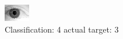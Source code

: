 \begin{figure}[h!]
\begin{center}
\includegraphics[width=0.60\columnwidth]{figures/ID2218_class_4_target_3.png}
\end{center}
\caption{ Classification: 4 actual target: 3}
\label{fig:ID2218_class_4_target_3}
\end{figure}
